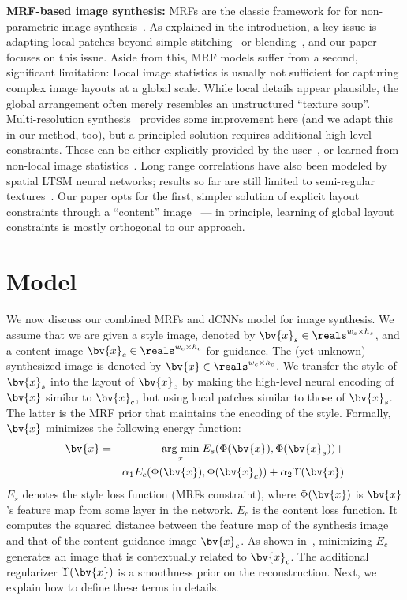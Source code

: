 \documentclass[10pt,twocolumn,letterpaper]{article}
\newcommand{\argmin}[1]{\underset{#1}{\operatorname{arg}\,\operatorname{min}}\;}
\begin{document}
\textbf{MRF-based image synthesis:}
MRFs are the classic framework for for non-parametric image synthesis~\cite{Efros99}.
As explained in the introduction, a key issue is adapting local patches beyond simple stitching~\cite{Kwatra03} or blending~\cite{Kwatra05}, and our paper focuses on this issue. Aside from this, MRF models suffer from a second, significant limitation: Local image statistics is usually not sufficient for capturing complex image layouts at a global scale. While local details appear plausible, the global arrangement often merely resembles an unstructured ``texture soup''. Multi-resolution synthesis~\cite{Hertzmann01,Kwatra05,Wei00} provides some improvement here (and we adapt this in our method, too), but a principled solution requires additional high-level constraints. These can be either explicitly provided by the user~\cite{Agarwala04,Barnes09,Efros01,Gatys15,Hertzmann01,Lee10,Xie07}, or learned from non-local image statistics~\cite{He12,Li15,Zhang13}. Long range correlations have also been modeled by spatial LTSM neural networks; results so far are still limited to semi-regular textures~\cite{Theis2015}.
 Our paper opts for the first, simpler solution of explicit layout constraints through a ``content'' image~\cite{Gatys15,Hertzmann01} --- in principle, learning of global layout constraints is mostly orthogonal to our approach.






\section{Model}
We now discuss our combined MRFs and dCNNs model for image synthesis. We assume that we are given a style image, denoted by $\bv{x}_s \in \reals^{w_s \times h_s}$, and a content image $\bv{x}_c \in \reals^{w_c \times h_c}$ for guidance. The (yet unknown) synthesized image is denoted by $\bv{x} \in \reals^{w_c \times h_c}$. We transfer the style of $\bv{x}_s$ into the layout of $\bv{x}_c$ by making the high-level neural encoding of $\bv{x}$ similar to $\bv{x}_c$, but using local patches similar to those of $\bv{x}_s$. The latter is the MRF prior that maintains the encoding of the style.
Formally, $\bv{x}$ minimizes the following energy function:
\begin{eqnarray}
\bv{x}&= &\argmin{x}E_{s}(\Phi(\bv{x}), \Phi(\bv{x}_{s})) + \nonumber \\&& \alpha_{1}E_{c}(\Phi(\bv{x}), \Phi(\bv{x}_{c})) + \alpha_{2}\Upsilon(\bv{x})
\label{eq:energy}
\end{eqnarray}
$E_{s}$ denotes the style loss function (MRFs constraint), where $\Phi(\bv{x})$ is $\bv{x}$'s feature map from some layer in the network. 
$E_{c}$ is the content loss function. It computes the squared distance between the feature map of the synthesis image and that of the content guidance image $\bv{x}_{c}$. As shown in~\cite{Gatys15,Mahendran15}, minimizing $E_{c}$ generates an image that is contextually related to $\bv{x}_{c}$. The additional regularizer $\Upsilon(\bv{x})$ is a smoothness prior on the reconstruction. Next, we explain how to define these terms in details.
\end{document}
